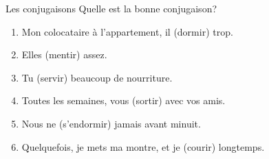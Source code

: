 \begin{frame}{Les conjugaisons}
  Quelle est la bonne conjugaison? \\
  \begin{enumerate}
    \item Mon colocataire à l'appartement, il \underline{} (dormir) trop.
    \item Elles \underline{} (mentir) assez.
    \item Tu \underline{} (servir) beaucoup de nourriture.
    \item Toutes les semaines, vous \underline{} (sortir) avec vos amis.
    \item Nous ne \underline{} (s'endormir) jamais avant minuit.
    \item Quelquefois, je mets ma montre, et je \underline{} (courir) longtemps.
  \end{enumerate}
\end{frame}